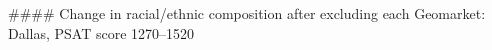 #### Change in racial/ethnic composition after excluding each Geomarket: Dallas, PSAT score 1270–1520
